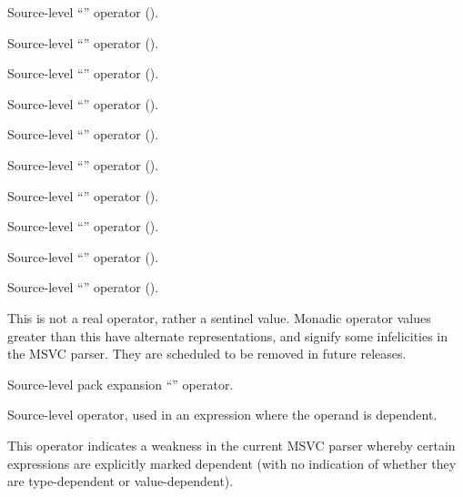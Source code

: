 Source-level ``'' operator ().

Source-level ``'' operator ().

Source-level ``'' operator ().

Source-level ``'' operator ().

Source-level ``'' operator ().

Source-level ``'' operator ().

Source-level ``'' operator ().

Source-level ``'' operator ().

Source-level ``'' operator ().

Source-level ``'' operator ().


This is not a real operator, rather a sentinel value.  Monadic operator values greater than this
have alternate representations, and signify some infelicities in the MSVC parser.  They are
scheduled to be removed in future releases.

Source-level pack expansion ``'' operator.

Source-level  operator, used in an expression where the operand is dependent.

This operator indicates a weakness in the current MSVC parser whereby certain expressions are explicitly
marked dependent (with no indication of whether they are type-dependent or value-dependent).

